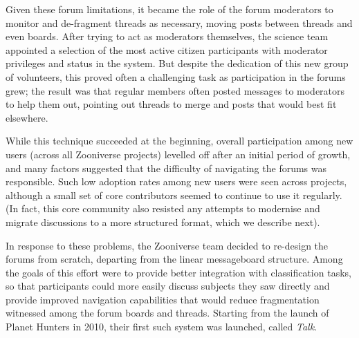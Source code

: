 \documentclass{sigchi}
\begin{document}
Given these forum limitations, it became the role of the forum moderators to monitor and de-fragment threads as necessary, moving posts between threads and even boards.  After trying to act as moderators themselves, the science team appointed a selection of the most active citizen participants with moderator privileges and status in the system.  But despite the dedication of this new group of volunteers, this proved often a challenging task as participation in the forums grew; the result was that regular members often posted messages to moderators to help them out, pointing out threads to merge and posts that would best fit elsewhere.

While this technique succeeded at the beginning, overall participation among new users (across all Zooniverse projects) levelled off after an initial period of growth, and many factors suggested that the difficulty of navigating the forums was responsible. Such low adoption rates among new users were seen across projects, although a small set of core contributors seemed to continue to use it regularly.  (In fact, this core community also resisted any attempts to modernise and migrate discussions to a more structured format, which we describe next).



In response to these problems, the Zooniverse team decided to re-design the forums from scratch, departing from the linear messageboard structure.  Among the goals of this effort were to provide better integration with classification tasks, so that participants could more easily discuss subjects they saw directly and provide improved navigation capabilities that would reduce fragmentation witnessed among the forum boards and threads.  Starting from the launch of Planet Hunters in 2010, their first such system was launched, called \emph{Talk}.  
\end{document}
